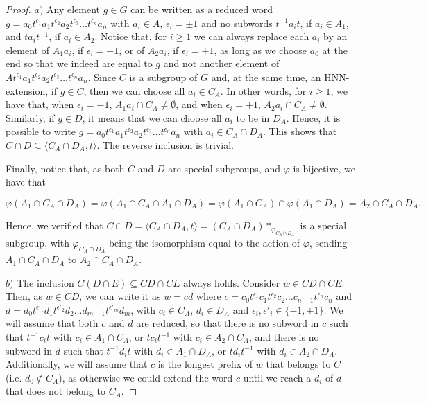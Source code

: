 \documentclass[11pt,letterpaper]{amsart}
\begin{document}
\begin{proof}
    $a)$ Any element $g \in G$ can be written as a reduced word $g=a_0t^{\epsilon_1}a_1t^{\epsilon_2}a_2 t^{\epsilon_3}\ldots t^{\epsilon_n}a_n$
    with $a_i\in A$, $\epsilon_i=\pm1$ and no subwords $t^{-1}a_it$, if $a_i\in A_1$, and $ta_it^{-1}$, if $a_i\in A_2$.
    Notice that, for $i\geq 1$ we can always replace each $a_i$  by an element of $A_1a_i$, if $\epsilon_i=-1$, or of $A_2a_i$, if $\epsilon_i=+1$, as long as we choose $a_0$ at the end so that we indeed are equal to $g$ and not another element of $At^{\epsilon_1}a_1t^{\epsilon_2}a_2 t^{\epsilon_3}\ldots t^{\epsilon_n}a_n$.
Since $C$ is a subgroup of $G$ and, at the same time, an HNN-extension, if $g\in C$, then we can choose all $a_i\in C_A$.
In other words, for $i \geq 1$, we have that, when $\epsilon_i=-1$, $A_1 a_i \cap C_A \neq \emptyset$, and when $\epsilon_i=+1$, $A_2 a_i \cap C_A \neq \emptyset$.
Similarly, if $g \in D$, it means that we can choose all $a_i$ to be in $D_A$. Hence, it is possible to write $g=a_0t^{\epsilon_1}a_1t^{\epsilon_2}a_2 t^{\epsilon_3}\ldots t^{\epsilon_n}a_n$ with $a_i \in C_A\cap D_A$.
This shows that $C \cap D \subseteq \langle C_A\cap D_A,t\rangle$. The reverse inclusion is trivial.


     Finally, notice that, as both $C$ and $D$ are special subgroups, and $\varphi$ is bijective, we have that 
     
     $$\varphi(A_1\cap C_A\cap D_A) = \varphi(A_1\cap C_A\cap A_1\cap D_A) = \varphi(A_1\cap C_A)\cap 
     \varphi(A_1\cap D_A)=A_2\cap C_A\cap D_A.$$
     
     Hence, we verified that $C\cap D = \langle C_A\cap D_A,t\rangle = (C_A\cap D_A)*_{\varphi_{C_A\cap D_A}}$ is a special subgroup, with $\varphi_{C_A\cap D_A}$ being the isomorphism equal to the action of $\varphi$, sending $A_1\cap C_A\cap D_A$ to $A_2\cap C_A\cap D_A$. 

    $b)$ The inclusion $C(D\cap E)\subseteq CD\cap CE$ always holds. Consider $w\in CD\cap CE$. Then, as $w\in CD$, we can write it as $w = cd$ where $c =c_0 t^{\epsilon_1} c_1 t^{\epsilon_2} c_2\ldots c_{n-1}t^{\epsilon_n}c_n$ and $d=d_0 t^{\epsilon'_1} d_1 t^{\epsilon'_2} d_2\ldots d_{m-1}t^{\epsilon'_m}d_m$, with $c_i\in C_A$, $d_i\in D_A$ and $\epsilon_i,\epsilon'_i\in\{-1,+1\}$. We will assume that both $c$ and $d$ are reduced, so that there is no subword in $c$ such that $t^{-1}c_it$ with $c_i\in A_1\cap C_A$, or $tc_it^{-1}$ with $c_i\in A_2\cap C_A$, and there is no subword in $d$ such that $t^{-1}d_it$ with $d_i\in A_1\cap D_A$, or $td_it^{-1}$ with $d_i\in A_2\cap D_A$. Additionally, we will assume that $c$ is the longest prefix of $w$ that belongs to $C$ (i.e. $d_0\notin C_A$), as otherwise we could extend the word $c$ until we reach a $d_i$ of $d$ that does not belong to $C_A$.


\end{proof}
\end{document}
